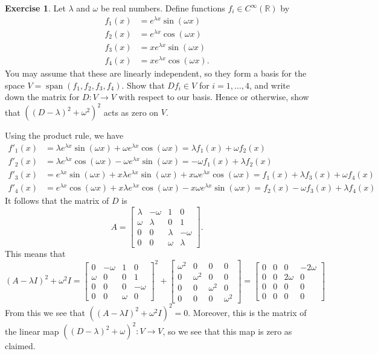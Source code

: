 \documentclass{amsart}
\newcommand{\R}         {{\mathbb{R}}}
\newcommand{\bpm}       {\left[\begin{matrix}}
\newcommand{\epm}       {\end{matrix}\right]}
\newcommand{\lm}        {\lambda}
\newcommand{\om}        {\omega}
\newcommand{\xra}       {\xrightarrow}
\newcommand{\spn}       {\operatorname{span}}
\renewcommand{\:}{\colon}
\theoremstyle{definition}
\newtheorem{exercise}{Exercise}
\newenvironment{solution}{{\noindent \bf Solution:}}{}
\begin{document}
\begin{exercise}
 Let $\lm$ and $\om$ be real numbers.  Define functions
 $f_i\in C^\infty(\R)$ by
 \begin{align*}
  f_1(x) &= e^{\lm x}\sin(\om x) \\
  f_2(x) &= e^{\lm x}\cos(\om x) \\
  f_3(x) &= x e^{\lm x}\sin(\om x) \\
  f_4(x) &= x e^{\lm x}\cos(\om x).
 \end{align*}
 You may assume that these are linearly independent, so they
 form a basis for the space $V=\spn(f_1,f_2,f_3,f_4)$.  Show
 that $Df_i\in V$ for $i=1,\dotsc,4$, and write down the
 matrix for $D\:V\xra{}V$ with respect to our basis.  Hence
 or otherwise, show that $((D-\lm)^2+\om^2)^2$ acts as zero
 on $V$.
\end{exercise}
\begin{solution}
 Using the product rule, we have
 \begin{align*}
  f'_1(x) &=
   \lm e^{\lm x}\sin(\om x) + \om e^{\lm x}\cos(\om x) =
   \lm f_1(x) + \om f_2(x) \\
  f'_2(x) &= 
   \lm e^{\lm x}\cos(\om x) - \om e^{\lm x}\sin(\om x) =
   -\om f_1(x) + \lm f_2(x) \\
  f'_3(x) &= 
   e^{\lm x}\sin(\om x) + x \lm e^{\lm x}\sin(\om x) + x \om e^{\lm x}\cos(\om x) =
   f_1(x) + \lm f_3(x) + \om f_4(x) \\
  f'_4(x) &= 
   e^{\lm x}\cos(\om x) + x \lm e^{\lm x}\cos(\om x) - x \om e^{\lm x}\sin(\om x) =
   f_2(x) - \om f_3(x) + \lm f_4(x)   
 \end{align*}
 It follows that the matrix of $D$ is
 \[ A = \bpm \lm & -\om &  1  &   0  \\
             \om &  \lm &  0  &   1  \\
              0  &   0  & \lm & -\om \\
              0  &   0  & \om &  \lm \epm.
 \]
 This means that 
 \[ (A-\lm I)^2 + \om^2 I = 
    \bpm  0  & -\om &  1  &   0  \\
         \om &   0  &  0  &   1  \\
          0  &   0  &  0  & -\om \\
          0  &   0  & \om &   0 \epm^2 + 
    \bpm \om^2 & 0 & 0 & 0 \\ 0 & \om^2 & 0 & 0 \\
         0 & 0 & \om^2 & 0 \\ 0 & 0 & 0 & \om^2 \epm = 
    \bpm 0&0&0& -2\om \\ 0&0&2\om &0 \\ 0&0&0&0 \\ 0&0&0&0\epm
 \]
 From this we see that $((A-\lm I)^2+\om^2I)^2=0$.
 Moreover, this is the matrix of the linear map
 $((D-\lm)^2+\om)^2\:V\to V$, so we see that this map
 is zero as claimed.
\end{solution}
\end{document}
